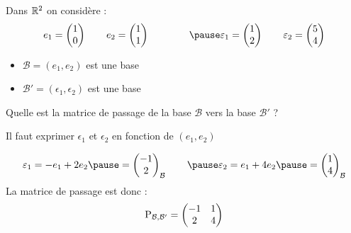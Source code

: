 \begin{frame}
\begin{exemple}
Dans $\mathbb{R}^2$ on considère :
\vspace*{-1ex}
$$
e_1 = \begin{pmatrix}1\\0\end{pmatrix} \qquad
e_2 = \begin{pmatrix}1\\1\end{pmatrix} \qquad\qquad
\pause
\epsilon_1 = \begin{pmatrix}1\\2\end{pmatrix} \qquad
\epsilon_2 = \begin{pmatrix}5\\4\end{pmatrix}$$
\vspace*{-2ex}
\pause
\begin{itemize}
  \item $\mathcal{B} = (e_1,e_2)$ est une base
  \pause
  \item $\mathcal{B}'=(\epsilon_1,\epsilon_2)$ est une base
\end{itemize}

\pause

Quelle est la matrice de passage de la base $\mathcal{B}$ vers 
la base $\mathcal{B}'$ ?

\pause
{} Il faut exprimer $\epsilon_1$ et $\epsilon_2$ en fonction de $(e_1,e_2)$

\pause

$$\epsilon_1 = -e_1+2e_2 \pause =  \begin{pmatrix}-1\\2\end{pmatrix}_{\mathcal{B}}
\qquad
\pause
\epsilon_2 = e_1+4e_2 \pause =  \begin{pmatrix}1\\4\end{pmatrix}_{\mathcal{B}}$$
\pause
La matrice de passage est donc :
\vspace*{-2ex}
$$\mathop{\text{P}}\nolimits_{\mathcal{B},\mathcal{B'}} = 
\begin{pmatrix}-1&1\\2&4\end{pmatrix}$$
\end{exemple}
\end{frame}


